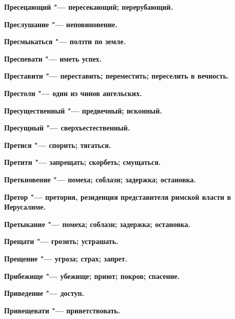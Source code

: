 \begin{multicols}{2}
\bfseries Пресецающий\normalfont{} "--- пересекающий; перерубающий. 




\bfseries Преслушание\normalfont{} "--- неповиновение. 




\bfseries Пресмыкаться\normalfont{} "--- ползти по земле. 




\bfseries Преспевати\normalfont{} "--- иметь успех. 




\bfseries Преставити\normalfont{} "--- переставить; переместить; переселить в вечность. 




\bfseries Престоли\normalfont{} "--- один из чинов ангельских. 




\bfseries Пресущественный\normalfont{} "--- предвечный; исконный. 




\bfseries Пресущный\normalfont{} "--- сверхъестественный. 




\bfseries Претися\normalfont{} "--- спорить; тягаться. 




\bfseries Претити\normalfont{} "--- запрещать; скорбеть; смущаться. 




\bfseries Преткновение\normalfont{} "--- помеха; соблазн; задержка; остановка. 




\bfseries Претор\normalfont{} "--- претория, резиденция представителя римской власти в Иерусалиме. 




\bfseries Претыкание\normalfont{} "--- помеха; соблазн; задержка; остановка. 




\bfseries Прещати\normalfont{} "--- грозить; устрашать. 




\bfseries Прещение\normalfont{} "--- угроза; страх; запрет. 




\bfseries Прибежище\normalfont{} "--- убежище; приют; покров; спасение. 




\bfseries Приведение\normalfont{} "--- доступ. 




\bfseries Привещевати\normalfont{} "--- приветствовать. 





\end{multicols}
